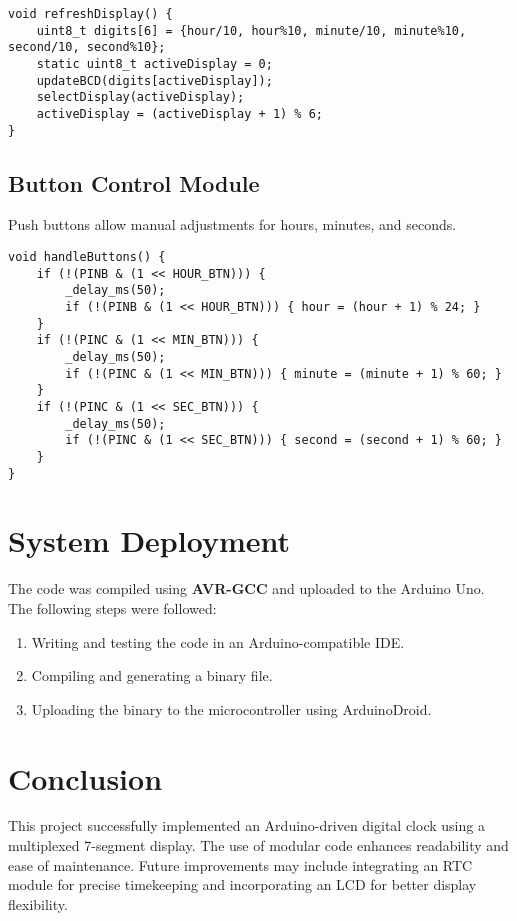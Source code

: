 \documentclass[journal]{IEEEtran}
\begin{document}
\begin{lstlisting}[style=CStyle]
void refreshDisplay() {
    uint8_t digits[6] = {hour/10, hour%10, minute/10, minute%10, second/10, second%10};
    static uint8_t activeDisplay = 0;
    updateBCD(digits[activeDisplay]);
    selectDisplay(activeDisplay);
    activeDisplay = (activeDisplay + 1) % 6;
}
\end{lstlisting}

\subsection{Button Control Module}
Push buttons allow manual adjustments for hours, minutes, and seconds.

\begin{lstlisting}[style=CStyle]
void handleButtons() {
    if (!(PINB & (1 << HOUR_BTN))) {
        _delay_ms(50);
        if (!(PINB & (1 << HOUR_BTN))) { hour = (hour + 1) % 24; }
    }
    if (!(PINC & (1 << MIN_BTN))) {
        _delay_ms(50);
        if (!(PINC & (1 << MIN_BTN))) { minute = (minute + 1) % 60; }
    }
    if (!(PINC & (1 << SEC_BTN))) {
        _delay_ms(50);
        if (!(PINC & (1 << SEC_BTN))) { second = (second + 1) % 60; }
    }
}
\end{lstlisting}

\section{System Deployment}
The code was compiled using \textbf{AVR-GCC} and uploaded to the Arduino Uno. The following steps were followed:
\begin{enumerate}
    \item Writing and testing the code in an Arduino-compatible IDE.
    \item Compiling and generating a binary file.
    \item Uploading the binary to the microcontroller using ArduinoDroid.
\end{enumerate}

\section{Conclusion}
This project successfully implemented an Arduino-driven digital clock using a multiplexed 7-segment display. The use of modular code enhances readability and ease of maintenance. Future improvements may include integrating an RTC module for precise timekeeping and incorporating an LCD for better display flexibility.
\end{document}
